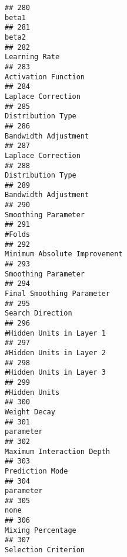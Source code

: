 \documentclass[
]{article}
\begin{document}
\begin{verbatim}
## 280                                                                                   beta1
## 281                                                                                   beta2
## 282                                                                           Learning Rate
## 283                                                                     Activation Function
## 284                                                                      Laplace Correction
## 285                                                                       Distribution Type
## 286                                                                    Bandwidth Adjustment
## 287                                                                      Laplace Correction
## 288                                                                       Distribution Type
## 289                                                                    Bandwidth Adjustment
## 290                                                                     Smoothing Parameter
## 291                                                                                  #Folds
## 292                                                            Minimum Absolute Improvement
## 293                                                                     Smoothing Parameter
## 294                                                               Final Smoothing Parameter
## 295                                                                        Search Direction
## 296                                                                #Hidden Units in Layer 1
## 297                                                                #Hidden Units in Layer 2
## 298                                                                #Hidden Units in Layer 3
## 299                                                                           #Hidden Units
## 300                                                                            Weight Decay
## 301                                                                               parameter
## 302                                                               Maximum Interaction Depth
## 303                                                                         Prediction Mode
## 304                                                                               parameter
## 305                                                                                    none
## 306                                                                       Mixing Percentage
## 307                                                                     Selection Criterion

\end{verbatim}
\end{document}

